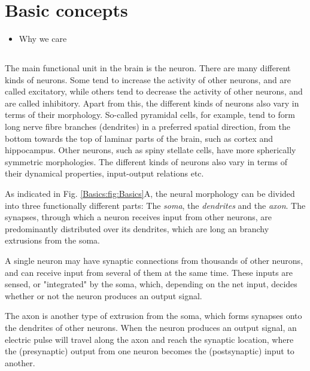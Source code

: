 \section{Basic concepts} 
\label{sec:Basics}

\begin{itemize}
\item Why we care \citep{Buzsaki2012,Pettersen2012,Einevoll2013,Einevoll2013a,Einevoll2019}
\end{itemize}


\subsection{}
The main functional unit in the brain is the neuron. There are many different kinds of neurons. Some tend to increase the activity of other neurons, and are called excitatory, while others tend to decrease the activity of other neurons, and are called inhibitory. Apart from this, the different kinds of neurons also vary in terms of their morphology. So-called pyramidal cells, for example, tend to form long nerve fibre branches (dendrites) in a preferred spatial direction, from the bottom towards the top of laminar parts of the brain, such as cortex and hippocampus. Other neurons, such as spiny stellate cells, have more spherically symmetric morphologies. The different kinds of neurons also vary in terms of their dynamical properties, input-output relations etc. 

As indicated in Fig. \ref{Basics:fig:Basics}A, the neural morphology can be divided into three functionally different parts: The \textit{soma}, the \textit{dendrites} and the \textit{axon}. The synapses, through which a neuron receives input from other neurons, are predominantly distributed over its dendrites, which are long an branchy extrusions from the soma.

A single neuron may have synaptic connections from thousands of other neurons, and can receive input from several of them at the same time. These inputs are sensed, or "integrated" by the soma, which, depending on the net input, decides whether or not the neuron produces an output signal. 

The axon is another type of extrusion from the soma, which forms synapses onto the dendrites of other neurons. When the neuron produces an output signal, an electric pulse will travel along the axon and reach the synaptic location, where the (presynaptic) output from one neuron becomes the (postsynaptic) input to another. 

